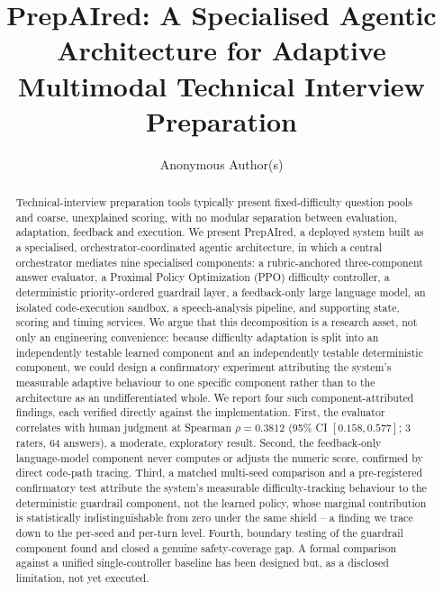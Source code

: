 \documentclass[runningheads]{llncs}
\begin{document}
\title{PrepAIred: A Specialised Agentic Architecture for Adaptive Multimodal Technical Interview Preparation}

\author{Anonymous Author(s)}

\maketitle

\begin{abstract}
Technical-interview preparation tools typically present fixed-difficulty question pools and coarse, unexplained scoring, with no modular separation between evaluation, adaptation, feedback and execution. We present PrepAIred, a deployed system built as a specialised, orchestrator-coordinated agentic architecture, in which a central orchestrator mediates nine specialised components: a rubric-anchored three-component answer evaluator, a Proximal Policy Optimization (PPO) difficulty controller, a deterministic priority-ordered guardrail layer, a feedback-only large language model, an isolated code-execution sandbox, a speech-analysis pipeline, and supporting state, scoring and timing services. We argue that this decomposition is a research asset, not only an engineering convenience: because difficulty adaptation is split into an independently testable learned component and an independently testable deterministic component, we could design a confirmatory experiment attributing the system's measurable adaptive behaviour to one specific component rather than to the architecture as an undifferentiated whole. We report four such component-attributed findings, each verified directly against the implementation. First, the evaluator correlates with human judgment at Spearman $\rho = 0.3812$ (95\% CI $[0.158, 0.577]$; 3 raters, 64 answers), a moderate, exploratory result. Second, the feedback-only language-model component never computes or adjusts the numeric score, confirmed by direct code-path tracing. Third, a matched multi-seed comparison and a pre-registered confirmatory test attribute the system's measurable difficulty-tracking behaviour to the deterministic guardrail component, not the learned policy, whose marginal contribution is statistically indistinguishable from zero under the same shield -- a finding we trace down to the per-seed and per-turn level. Fourth, boundary testing of the guardrail component found and closed a genuine safety-coverage gap. A formal comparison against a unified single-controller baseline has been designed but, as a disclosed limitation, not yet executed.

\end{abstract}
\end{document}
